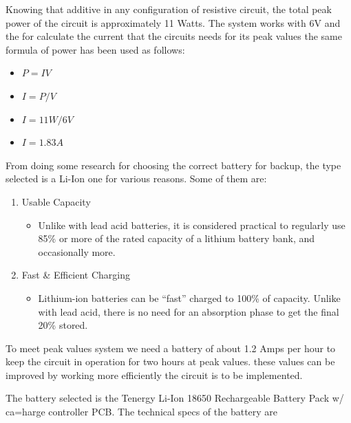 \documentclass[12pt]{article}
\begin{document}
Knowing that additive in any configuration of resistive circuit, the total peak power of the circuit is approximately 11 Watts. The system works with 6V and the for calculate the current that the circuits needs for its peak values the same formula of power\cite{AllAboutCircuits} has been used as follows:

\begin{itemize}
  \item \(P = IV\)
  \item \(I = P/V\)
  \item \(I = 11W/6V\)
  \item \(I = 1.83A\)
\end{itemize}

From doing some research for choosing the correct battery for backup, the type selected is a Li-Ion one for various reasons. Some of them are:

\begin{enumerate}
  \item Usable Capacity

  \begin{itemize}
    \item Unlike with lead acid batteries, it is considered practical to regularly use 85\% or more of the rated capacity of a lithium battery bank, and occasionally more.
  \end{itemize}

  \item Fast \& Efficient Charging
  \begin{itemize}
    \item Lithium-ion batteries can be “fast” charged to 100\% of capacity. Unlike with lead acid, there is no need for an absorption phase to get the final 20\% stored.
  \end{itemize}
\end{enumerate}

To meet peak values system we need a battery of about 1.2 Amps per hour to keep the circuit in operation for two hours at peak values. these values can be improved by working more efficiently the circuit is to be implemented.

The battery selected is the Tenergy Li-Ion 18650 Rechargeable Battery Pack w/ ca=harge controller PCB. The technical specs of the battery are
\end{document}
